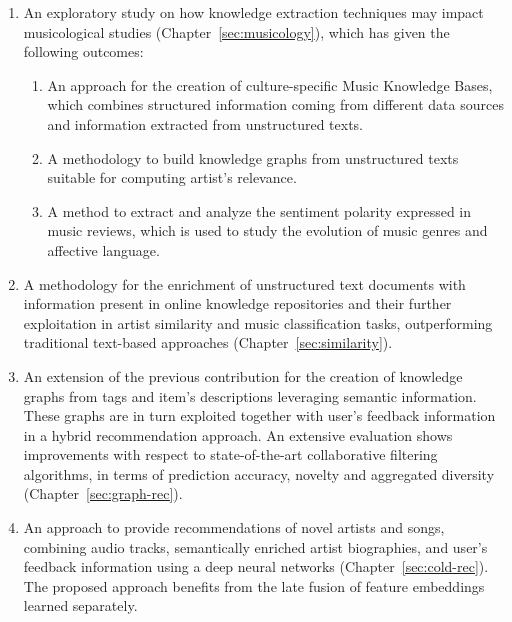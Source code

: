 \begin{enumerate}
\item 
An exploratory study on how knowledge extraction techniques may impact musicological studies (Chapter~\ref{sec:musicology}), which has given the following outcomes:
\begin{enumerate}
\item 
An approach for the creation of culture-specific Music Knowledge Bases, which combines structured information coming from different data sources and information extracted from unstructured texts. 
\item
A methodology to build knowledge graphs from unstructured texts suitable for computing artist's relevance.
\item 
A method to extract and analyze the sentiment polarity expressed in music reviews, which is used to study the evolution of music genres and affective language.
\end{enumerate}

\item 
A methodology for the enrichment of unstructured text documents with information present in online knowledge repositories and their further exploitation in artist similarity and music classification tasks, outperforming traditional text-based approaches (Chapter~\ref{sec:similarity}).

\item
An extension of the previous contribution for the creation of knowledge graphs from tags and item's descriptions leveraging semantic information. These graphs are in turn exploited together with user's feedback information in a hybrid recommendation approach. An extensive evaluation shows improvements with respect to state-of-the-art collaborative filtering algorithms, in terms of prediction accuracy, novelty and aggregated diversity (Chapter~\ref{sec:graph-rec}).%

\item 
An approach to provide recommendations of novel artists and songs, combining audio tracks, semantically enriched artist biographies, and user's feedback information using a deep neural networks (Chapter~\ref{sec:cold-rec}). The proposed approach benefits from the late fusion of feature embeddings learned separately. %


\end{enumerate}
